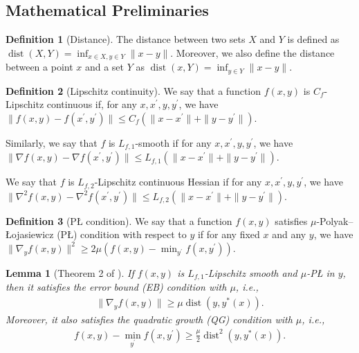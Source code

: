 \documentclass{article}
\theoremstyle{plain}
\newtheorem{lemma}{Lemma}
\theoremstyle{definition}
\newtheorem{definition}{Definition}
\theoremstyle{remark}
\DeclareMathOperator{\dist}{dist}
\begin{document}
\clearpage
\newpage

\subsection{Mathematical Preliminaries}
\begin{definition}[Distance]
    \label{definition: distance}
    The distance between two sets $X$ and $Y$ is defined as $\dist(X,Y) = \inf_{x\in X, y\in Y} \| x - y \|$.
    Moreover, we also define the distance between a point $x$ and a set $Y$ as $\dist(x,Y) = \inf_{y\in Y} \| x - y \|$.
\end{definition}

\begin{definition}[Lipschitz continuity]
 We say that a function $f(x,y)$ is $C_f$-Lipschitz continuous if, for any $x,x^\prime,y,y^\prime$, we have $\| f(x,y) - f(x^\prime,y^\prime) \| \leq C_f (\| x-x^\prime \| + \| y-y^\prime \|)$.
    
Similarly, we say that $f$ is $L_{f,1}$-smooth if for any $x,x^\prime,y,y^\prime$, we have $\| \nabla f(x,y) - \nabla f(x^\prime,y^\prime) \| \leq L_{f,1} (\| x-x^\prime \| + \| y-y^\prime \|)$. 
    
We say that $f$ is $L_{f,2}$-Lipschitz continuous Hessian if for any $x,x^\prime,y,y^\prime$, we have $\| \nabla^2 f(x,y) - \nabla^2 f(x^\prime,y^\prime) \| \leq L_{f,2} (\| x-x^\prime \| + \| y-y^\prime \|)$.
\end{definition}

\begin{definition}[P{\L} condition]
    We say that a function $f(x,y)$ satisfies $\mu$-Polyak--{\L}ojasiewicz (P{\L}) condition with respect to $y$ if for any fixed $x$ and any $y$, we have $\| \nabla_y f(x,y) \|^2 \geq 2\mu (f(x,y) - \min_{y^\prime} f(x,y^\prime))$.
\end{definition}

\begin{lemma}[Theorem 2 of \citet{karimi2016linear}]
    If $f(x,y)$ is $L_{f,1}$-Lipschitz smooth and $\mu$-P{\L} in $y$, then it satisfies the error bound (EB) condition with $\mu$, i.e.,
    \begin{align}
        \| \nabla_y f(x,y)\| \geq \mu \dist(y, y^*(x)).
    \end{align}
    Moreover, it also satisfies the quadratic growth (QG) condition with $\mu$, i.e.,
    \begin{align}
        f(x,y) - \min_{y^\prime} f(x,y^\prime) \geq \frac{\mu}{2} \dist^2(y,y^*(x)).
    \end{align}
\end{lemma}
\end{document}
